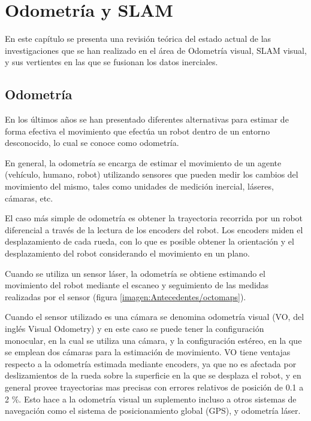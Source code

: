 \chapter{Odometría y SLAM}
\label{capitulo2}

En este capítulo se presenta una revisión teórica del estado actual de las investigaciones que se han realizado en el área de Odometría visual, SLAM visual, y sus vertientes en las que se fusionan los datos inerciales.

\section{Odometría}

En los últimos años se han presentado diferentes alternativas para estimar de forma efectiva el movimiento que efectúa un robot dentro de un entorno desconocido, lo cual se conoce como odometría.

En general, la odometría se encarga de estimar el movimiento de un agente (vehículo, humano, robot) utilizando sensores que pueden medir los cambios del movimiento del mismo, tales como unidades de medición inercial, láseres, cámaras, etc.

El caso más simple de odometría es obtener la trayectoria recorrida por un robot diferencial a través de la lectura de los encoders del robot. Los encoders miden el desplazamiento de cada rueda, con lo que es posible obtener la orientación y el desplazamiento del robot considerando el movimiento en un plano.

Cuando se utiliza un sensor láser, la odometría se obtiene estimando el movimiento del robot mediante el escaneo y seguimiento de las medidas realizadas por el sensor (figura \ref{imagen:Antecedentes/octomaps}).

Cuando el sensor utilizado es una cámara se denomina odometría visual (VO, del inglés Visual Odometry) y en este caso se puede tener la configuración monocular, en la cual se utiliza una cámara, y la configuración estéreo, en la que se emplean dos cámaras para la estimación de movimiento. VO tiene ventajas respecto a la odometría estimada mediante encoders, ya que no es afectada por deslizamientos de la rueda sobre la superficie en la que se desplaza el robot, y en general provee trayectorias mas precisas con errores relativos de posición de 0.1 a 2 \%. Esto hace a la odometría visual un suplemento incluso a otros sistemas de navegación como el sistema de posicionamiento global (GPS), y odometría láser.

